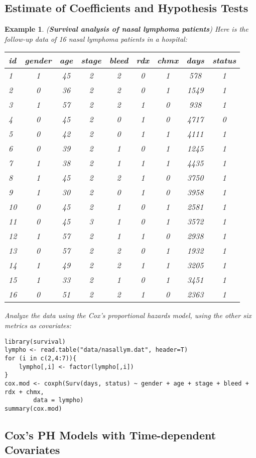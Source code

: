 \documentclass[11pt,addpoints,answers]{exam}
\newtheorem{example}{Example}
\begin{document}
\begin{CJK*}{UTF8}{gbsn}
\subsection{Estimate of Coefficients and Hypothesis Tests}
\begin{example}{({\bf Survival analysis of nasal lymphoma patients})}
Here is the follow-up data of 16 nasal lymphoma patients in a hospital:

\begin{tabular}{lcccccccc}
\hline
id & gender & age & stage & bleed & rdx & chmx & days & status\\
\hline
1 & 1 & 45 & 2 & 2 & 0 & 1 & 578 & 1\\
2 & 0 & 36 & 2 & 2 & 0 & 1 & 1549 & 1\\
3 & 1 & 57 & 2 & 2 & 1 & 0 & 938 & 1\\
4 & 0 & 45 & 2 & 0 & 1 & 0 & 4717 & 0\\
5 & 0 & 42 & 2 & 0 & 1 & 1 & 4111 & 1\\
6 & 0 & 39 & 2 & 1 & 0 & 1 & 1245 & 1\\
7 & 1 & 38 & 2 & 1 & 1 & 1 & 4435 & 1\\
8 & 1 & 45 & 2 & 2 & 1 & 0 & 3750 & 1\\
9 & 1 & 30 & 2 & 0 & 1 & 0 & 3958 & 1\\
10 & 0 & 45 & 2 & 1 & 0 & 1 & 2581 & 1\\
11 & 0 & 45 & 3 & 1 & 0 & 1 & 3572 & 1\\
12 & 1 & 57 & 2 & 1 & 1 & 0 & 2938 & 1\\
13 & 0 & 57 & 2 & 2 & 0 & 1 & 1932 & 1\\
14 & 1 & 49 & 2 & 2 & 1 & 1 & 3205 & 1\\
15 & 1 & 33 & 2 & 1 & 0 & 1 & 3451 & 1\\
16 & 0 & 51 & 2 & 2 & 1 & 0 & 2363 & 1\\
\hline
\end{tabular}

Analyze the data using the Cox's proportional hazards model, using the other six metrics as 
covariates:
\begin{lstlisting}
library(survival)
lympho <- read.table("data/nasallym.dat", header=T)
for (i in c(2,4:7)){
	lympho[,i] <- factor(lympho[,i])
}
cox.mod <- coxph(Surv(days, status) ~ gender + age + stage + bleed + rdx + chmx, 
		data = lympho)
summary(cox.mod)
\end{lstlisting}
\end{example}


\subsection{Cox's PH Models with Time-dependent Covariates}


\end{CJK*}
\end{document}
